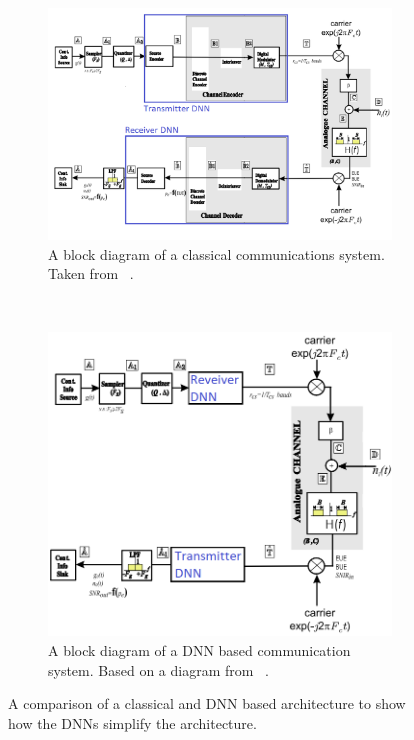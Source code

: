 \documentclass[12pt,onecolumn,letterpaper]{article}
\begin{document}
\begin{figure}[t!]
   \centering
   \begin{subfigure}[t]{0.45\textwidth}
      \centering
      \includegraphics[width=\linewidth]{figures/classical_comms_block_diagram.png}
      \caption{A block diagram of a classical communications system. Taken from ~\cite{EE3CommsSystemsNotesL4}.}
      \label{fig:ClassicalCommsBlockDiagram}
  \end{subfigure}
  ~
  \begin{subfigure}[t]{0.45\textwidth}
       \centering
       \includegraphics[width=\linewidth]{figures/dnn_block_diagram.png}
       \caption{A block diagram of a DNN based communication system. Based on a diagram from ~\cite{EE3CommsSystemsNotesL4}.}
       \label{fig:DNNCommsBlockDiagram}
   \end{subfigure}
   \caption{A comparison of a classical and DNN based architecture to show how the DNNs simplify the architecture.}
   \label{fig:tSneConstellationDiags}
\end{figure}
\end{document}
